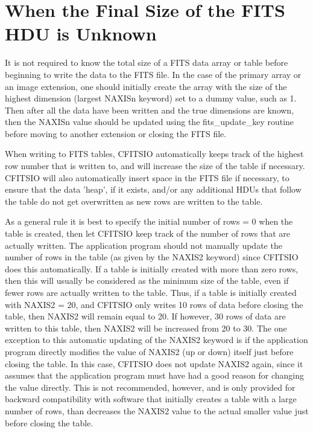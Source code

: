 \documentclass[11pt]{book}
\begin{document}
\section{When the Final Size of the FITS HDU is Unknown}

It is not required to know the total size of a FITS data array or table
before beginning to write the data to the FITS file.  In the case of
the primary array or an image extension, one should initially create
the array with the size of the highest dimension (largest NAXISn
keyword) set to a dummy value, such as 1.  Then after all the data have
been written and the true dimensions are known, then the NAXISn value
should be updated using the fits\_update\_key routine before moving to
another extension or closing the FITS file.

When writing to FITS tables, CFITSIO automatically keeps track of the
highest row number that is written to, and will increase the size of
the table if necessary.  CFITSIO will also automatically insert space
in the FITS file if necessary, to ensure that the data 'heap', if it
exists, and/or any additional HDUs that follow the table do not get
overwritten as new rows are written to the table.

As a general rule it is best to specify the initial number of rows = 0
when the table is created, then let CFITSIO keep track of the number of
rows that are actually written.  The application program should not
manually update the number of rows in the table (as given by the NAXIS2
keyword) since CFITSIO does this automatically.  If a table is
initially created with more than zero rows, then this will usually be
considered as the minimum size of the table, even if fewer rows are
actually written to the table.  Thus, if a table is initially created
with NAXIS2 = 20, and CFITSIO only writes 10 rows of data before
closing the table, then NAXIS2 will remain equal to 20.  If however, 30
rows of data are written to this table, then NAXIS2 will be increased
from 20 to 30.  The one exception to this automatic updating of the
NAXIS2 keyword is if the application program directly modifies the
value of NAXIS2 (up or down) itself just before closing the table.  In this
case, CFITSIO does not update NAXIS2 again, since it assumes that the
application program must have had a good reason for changing the value
directly.  This is not recommended, however, and is only provided for
backward compatibility with software that initially creates a table
with a large number of rows, than decreases the NAXIS2 value to the
actual smaller value just before closing the table.
\end{document}
